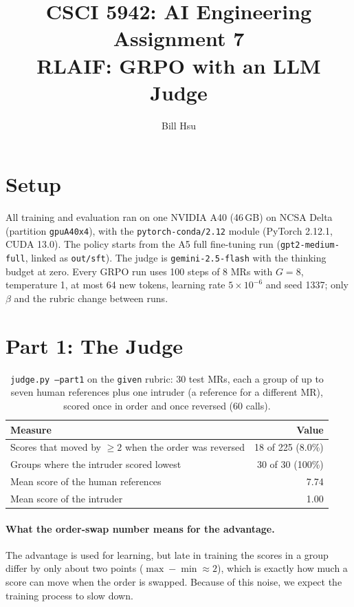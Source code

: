 \documentclass[10pt]{article}
\begin{document}
\title{CSCI 5942: AI Engineering Assignment 7\\RLAIF: GRPO with an LLM Judge}
\author{Bill Hsu}
\maketitle

\section*{Setup}

All training and evaluation ran on one NVIDIA A40 (46\,GB) on NCSA Delta
(partition \texttt{gpuA40x4}), with the \texttt{pytorch-conda/2.12} module
(PyTorch 2.12.1, CUDA 13.0). The policy starts from the A5 full
fine-tuning run (\texttt{gpt2-medium-full}, linked as \texttt{out/sft}).
The judge is \texttt{gemini-2.5-flash} with the thinking budget at zero.
Every GRPO run uses 100 steps of 8 MRs with $G = 8$, temperature 1,
at most 64 new tokens, learning rate $5 \times 10^{-6}$ and seed 1337;
only $\beta$ and the rubric change between runs.

\section*{Part 1: The Judge}

\begin{table}[htbp]
\caption{\texttt{judge.py --part1} on the \texttt{given} rubric: 30 test
MRs, each a group of up to seven human references plus one intruder (a
reference for a different MR), scored once in order and once reversed
(60 calls).}
\label{tab:part1}
\centering
\begin{tabular}{lr}
\toprule
Measure & Value \\
\midrule
Scores that moved by $\ge 2$ when the order was reversed & 18 of 225 (8.0\%) \\
Groups where the intruder scored lowest & 30 of 30 (100\%) \\
Mean score of the human references & 7.74 \\
Mean score of the intruder & 1.00 \\
\bottomrule
\end{tabular}
\end{table}

\paragraph{What the order-swap number means for the advantage.}
The advantage is used for learning, but late in training the scores in a
group differ by only about two points ($\max - \min \approx 2$), which is
exactly how much a score can move when the order is swapped. Because of
this noise, we expect the training process to slow down.
\end{document}
